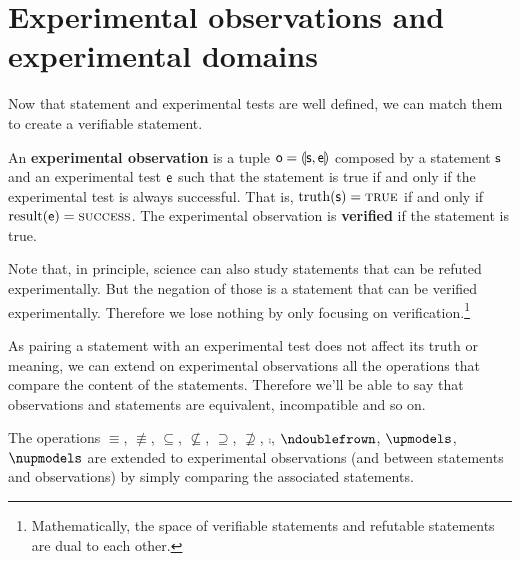 \documentclass[11pt,letterpaper,fleqn]{memoir} %
\begin{document}
\section{Experimental observations and experimental domains}

Now that statement and experimental tests are well defined, we can match them to create a verifiable statement.

\begin{mathSection}
\begin{defn}
	An \textbf{experimental observation} is a tuple $\mathsf{o} = \llparenthesis \mathsf{s}, \mathsf{e} \rrparenthesis$ composed by a statement $\mathsf{s}$ and an experimental test $\mathsf{e}$ such that the statement is true if and only if the  experimental test is always successful. That is, $\operatorname{truth}(\mathsf{s})=\textsc{true}$ if and only if $\operatorname{result}(\mathsf{e})=\textsc{success}$. The experimental observation is \textbf{verified} if the statement is true.
\end{defn}
\end{mathSection}

Note that, in principle, science can also study statements that can be refuted experimentally. But the negation of those is a statement that can be verified experimentally. Therefore we lose nothing by only focusing on verification.\footnote{Mathematically, the space of verifiable statements and refutable statements are dual to each other.}

As pairing a statement with an experimental test does not affect its truth or meaning, we can extend on experimental observations all the operations that compare the content of the statements. Therefore we'll be able to say that observations and statements are equivalent, incompatible and so on.

\begin{mathSection}
\begin{defn}
	The operations $\equiv$, $\nequiv$, $\subseteq$, $\nsubseteq$, $\supseteq$, $\nsupseteq$, $\comp$, $\ncomp$, $\indep$, $\nindep$ are extended to experimental observations (and between statements and observations) by simply comparing the associated statements.
\end{defn}
\end{mathSection}
\end{document}
